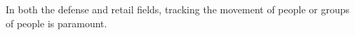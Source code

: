 



In both the defense and retail fields, tracking the movement of people or groups of people is paramount.
	






